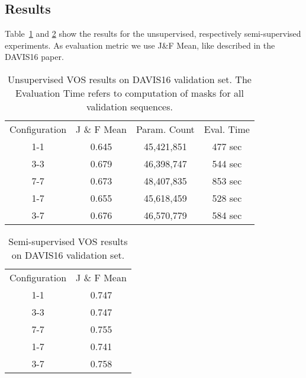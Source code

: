 \subsection{Results}
Table~\ref{unsupervised_results} and \ref{semi_supervised_results} show the results for the unsupervised, respectively semi-supervised experiments. As evaluation metric we use J\&F Mean, like described in the DAVIS16\cite{davis_2016} paper.
\begin{table}[]
	\centering
	\begin{tabular}{|c|c|c|c|}
		\cline{1-4}
		Configuration & J \& F Mean & Param. Count & Eval. Time \\ \cline{1-4}
		1-1  & 0.645  & 45,421,851 & 477 sec\\ \cline{1-4}
		3-3    & 0.679 & 46,398,747 & 544 sec\\ \cline{1-4}
		7-7    & 0.673 & 48,407,835 & 853 sec\\ \cline{1-4}
		1-7    & 0.655  & 45,618,459 & 528 sec\\ \cline{1-4}
		3-7    & 0.676  & 46,570,779 & 584 sec\\ \cline{1-4}
	\end{tabular}
	\caption{Unsupervised VOS results on DAVIS16 validation set. The Evaluation Time refers to computation of masks for all validation sequences.}
	\label{unsupervised_results}
\end{table}

\begin{table}[]
	\centering
	\begin{tabular}{|c|c|}
		\cline{1-2}
		Configuration & J \& F Mean\\ \cline{1-2}
		1-1  & 0.747  \\ \cline{1-2}
		3-3    & 0.747 \\ \cline{1-2}
		7-7    & 0.755 \\ \cline{1-2}
		1-7    & 0.741  \\ \cline{1-2}
		3-7    & 0.758  \\ \cline{1-2}
	\end{tabular}
	\caption{Semi-supervised VOS results on DAVIS16 validation set.}
	\label{semi_supervised_results}
\end{table}
